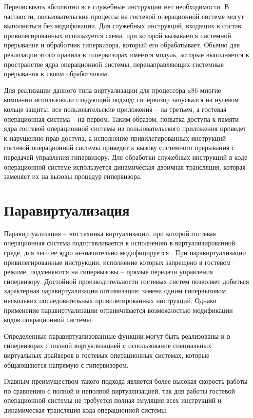 Переписывать абсолютно все служебные инструкции нет необходимости.
В частности, пользовательские процессы на гостевой операционной системе могут выполняться без модификации.
Для служебных инструкций, входящих в состав привилегированных используется схема, при которой вызывается системной прерывание и обработчик гипервизора, который его обрабатывает.
Обычно для реализации этого правила в гипервизорах имеется модуль, которые выполняется в пространстве ядра операционной системы, перенаправляющих системные прерывания к своим обработчикам.

Для реализации данного типа виртуализации для процессора x86 многие компании использовали следующий подход: гипервизор запускался на нулевом кольце защиты, все пользовательские приложения -- на третьем, а гостевая операционная система -- на первом. 
Таким образом, попытка доступа к памяти ядра гостевой операционной системы из пользовательского приложения приведет к нарушению прав доступа, а исполнение привилегированных инструкций гостевой операционной системы приведет к вызову системного прерывания с передачей управления гипервизору.
Для обработки служебных инструкций в коде операционной системе используется динамическая двоичная трансляция, которая заменяет их на вызовы процедур гипервизора.

\section{Паравиртуализация}
Паравиртуализация -- это техника виртуализации, при которой гостевая операционная система подготавливается к исполнению в виртуализированной среде, для чего ее ядро незначительно модифицируется \cite{рыбаков2021виртуализация}.
При паравиртуализации привилегированные инструкции, исполнение которых запрещено в гостевом режиме, подменяются на гипервызовы -- прямые передачи управления гипервизору.
Достойной производительности гостевых систем позволяет добиться характерная
паравиртуализации оптимизация: замена одним гипервызовом нескольких последовательных привилегированных инструкций. 
Однако применение паравиртуализации ограничивается возможностью модификации кодов операционной системы.

Определенные паравиртуализованные функции могут быть реализованы и в гипервизорах с полной виртуализацией с использование специальных виртуальных драйверов в гостевых операционных системах, которые общающаются напрямую с гипервизором.

Главным преимуществом такого подхода является более высокая скорость работы по сравнению с полной и неполной виртуализацией, так для работы гостевой операционной системы не требуется полная эмуляция всех инструкций и динамическая трансляция кода операционной системы.

